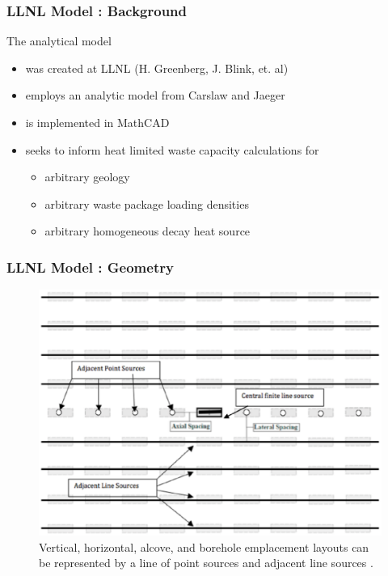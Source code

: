 
\begin{frame}[ctb!]
\frametitle{LLNL Model : Background}
The analytical  model
\begin{itemize} 
  \item was created at LLNL (H. Greenberg, J. Blink, et. al) \cite{hardin_generic_2011, sutton_investigations_2011, 
greenberg_application_2012}
  \item employs an analytic model from Carslaw and Jaeger \cite{carslaw_conduction_1959} 
  \item is implemented in MathCAD \cite{ptc_mathcad_2010}
  \item seeks to inform heat limited waste capacity calculations for 
    \begin{itemize}
      \item arbitrary geology 
      \item arbitrary waste package loading densities
      \item arbitrary homogeneous decay heat source
    \end{itemize}
\end{itemize}
\end{frame}

\begin{frame}
  \frametitle{LLNL Model : Geometry}
  \begin{figure}[h!]
    \begin{center}
      \includegraphics[width=0.7\columnwidth]{images/llnlConcept.eps}
    \end{center}
    \caption{Vertical, horizontal, alcove, and borehole emplacement layouts can 
    be represented by a line of point sources and adjacent line sources 
    \cite{sutton_investigations_2011}.}
    \label{fig:llnl}
  \end{figure}
\end{frame}

